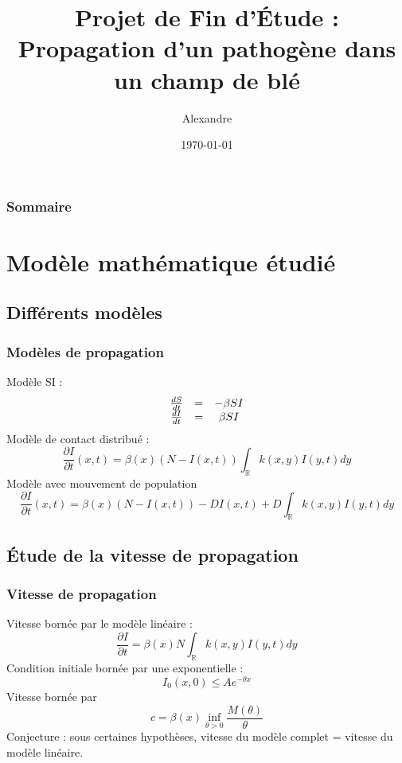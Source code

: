 \documentclass[handout]{beamer}
\title[PFE]{Projet de Fin d'Étude : \\ Propagation d'un pathogène dans un champ de blé}
\author{Alexandre \bsc{Vieira}}
\institute{INSA de Rouen}
\date{\today}
\newcommand{\derPar}[2]{\frac{\partial #1}{\partial #2}}
\begin{document}
\begin{frame}
\titlepage
\end{frame}

\begin{frame}
	\frametitle{Sommaire}
	\tableofcontents
\end{frame}

\section[Modèle]{Modèle mathématique étudié}
\subsection[Diff. modèles]{Différents modèles}
\begin{frame}
	\frametitle{Modèles de propagation}
Modèle SI :
\[\begin{array}{c c c}
	\frac{dS}{dt}&=&-\beta SI\\
	\frac{dI}{dt}&=&\beta SI
\end{array}\]
Modèle de contact distribué :
\begin{equation} \label{eqKot}
	\derPar{I}{t}(x,t)=\beta(x)(N-I(x,t))\int_{\mathbb{R}}k(x,y)I(y,t) dy
\end{equation}
Modèle avec mouvement de population
\begin{equation}
	\derPar{I}{t}(x,t)=\beta(x)(N-I(x,t))-DI(x,t)+D\int_{\mathbb{R}}k(x,y)I(y,t) dy
\end{equation}
\end{frame}

\subsection[Vitesse]{Étude de la vitesse de propagation}
\begin{frame}
	\frametitle{Vitesse de propagation}
Vitesse bornée par le modèle linéaire :
\[\derPar{I}{t}=\beta(x)N\int_{\mathbb{R}}k(x,y)I(y,t) dy\]
Condition initiale bornée par une exponentielle :
\[I_0(x,0)\leq Ae^{-\theta x}\]	
Vitesse bornée par
\begin{equation}\label{bornVit}
	c=\beta(x)\inf_{\theta>0}\frac{M(\theta)}{\theta}
\end{equation}
Conjecture : sous certaines hypothèses, vitesse du modèle complet = vitesse du modèle linéaire.
\end{frame}
\end{document}
